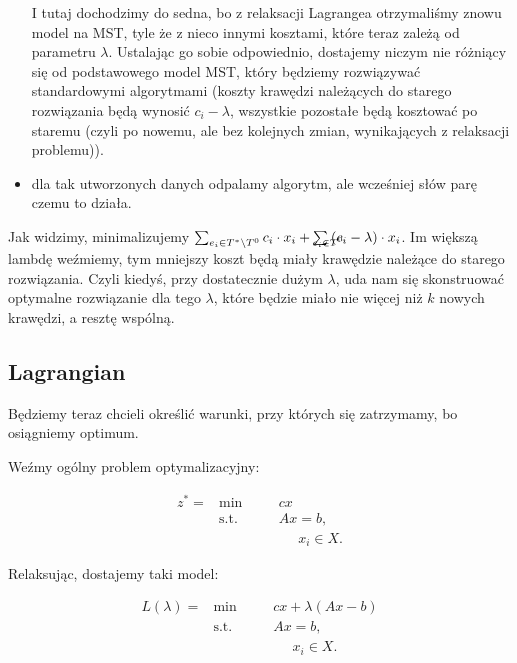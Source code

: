 \begin{itemize}
I tutaj dochodzimy do sedna, bo z relaksacji Lagrangea otrzymaliśmy znowu model na MST, tyle że z nieco innymi kosztami, które teraz zależą od parametru $\lambda$. Ustalając go sobie odpowiednio, dostajemy niczym nie różniący się od podstawowego model MST, który będziemy rozwiązywać standardowymi algorytmami (koszty krawędzi należących do starego rozwiązania będą wynosić $c_{i} - \lambda$, wszystkie pozostałe będą kosztować po staremu (czyli po nowemu, ale bez kolejnych zmian, wynikających z relaksacji problemu)).

\item dla tak utworzonych danych odpalamy algorytm, ale wcześniej słów parę czemu to działa.
\end{itemize}

Jak widzimy, minimalizujemy $\sum_{e_{i} \in T^{\ast} \setminus T^{0}} c_{i} \cdot x_{i} + \sum_{\mathclap{e_{i} \in T^{0}}} \left( c_{i} - \lambda \right) \cdot x_{i}$. Im większą lambdę weźmiemy, tym mniejszy koszt będą miały krawędzie należące do starego rozwiązania. Czyli kiedyś, przy dostatecznie dużym $\lambda$, uda nam się skonstruować optymalne rozwiązanie dla tego $\lambda$, które będzie miało nie więcej niż $k$ nowych krawędzi, a resztę wspólną.

\subsection{Lagrangian}

Będziemy teraz chcieli określić warunki, przy których się zatrzymamy, bo osiągniemy optimum.

Weźmy ogólny problem optymalizacyjny:

\begin{figure}[htb]
	\begin{subequations}
		\begin{alignat}{4}
		z^{\ast} = & \text{min} & & cx \\
		& \text{s.t.} & \quad & Ax = b,\\
		& & & \phantom{\sum} x_{i} \in X.
		\end{alignat}
	\end{subequations}
	\caption{}
\end{figure}%

Relaksując, dostajemy taki model:

\begin{figure}[htb]
	\begin{subequations}
		\begin{alignat}{4}
		L \left( \lambda \right) = & \text{min} & & cx + \lambda \left( Ax - b \right) \\
		& \text{s.t.} & \quad & Ax = b,\\
		& & & \phantom{\sum} x_{i} \in X.
		\end{alignat}
	\end{subequations}
	\caption{}
\end{figure}%

